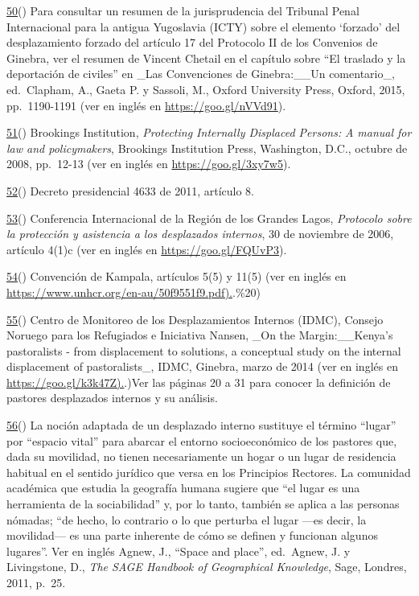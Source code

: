 \documentclass[
]{book}
\begin{document}
\protect\hyperlink{sdfootnote50anc}{50}() Para consultar un resumen de la jurisprudencia del Tribunal Penal Internacional para la antigua Yugoslavia (ICTY) sobre el elemento `forzado' del desplazamiento forzado del artículo 17 del Protocolo II de los Convenios de Ginebra, ver el resumen de Vincent Chetail en el capítulo sobre ``El traslado y la deportación de civiles'' en \_Las Convenciones de Ginebra:\_\_Un comentario\_, ed.~Clapham, A., Gaeta P. y Sassoli, M., Oxford University Press, Oxford, 2015, pp.~1190-1191 (ver en inglés en \url{https://goo.gl/nVVd91}).

\protect\hyperlink{sdfootnote51anc}{51}() Brookings Institution, \emph{Protecting Internally Displaced Persons:} \emph{A manual for law and policymakers}, Brookings Institution Press, Washington, D.C., octubre de 2008, pp.~12-13 (ver en inglés en \url{https://goo.gl/3xy7w5}).

\protect\hyperlink{sdfootnote52anc}{52}() Decreto presidencial 4633 de 2011, artículo 8.

\protect\hyperlink{sdfootnote53anc}{53}() Conferencia Internacional de la Región de los Grandes Lagos, \emph{Protocolo sobre la protección y asistencia a los desplazados internos}, 30 de noviembre de 2006, artículo 4(1)c (ver en inglés en \url{https://goo.gl/FQUvP3}).

\protect\hyperlink{sdfootnote54anc}{54}() Convención de Kampala, artículos 5(5) y 11(5) (ver en inglés en \href{https://goo.gl/BrdqYX}{https://www.unhcr.org/en-au/50f9551f9.pdf).}.\%20)

\protect\hyperlink{sdfootnote55anc}{55}() Centro de Monitoreo de los Desplazamientos Internos (IDMC), Consejo Noruego para los Refugiados e Iniciativa Nansen, \_On the Margin:\_\_Kenya's pastoralists - from displacement to solutions, a conceptual study on the internal displacement of pastoralists\_, IDMC, Ginebra, marzo de 2014 (ver en inglés en \href{https://goo.gl/k3k47Z}{https://goo.gl/k3k47Z).}.)Ver las páginas 20 a 31 para conocer la definición de pastores desplazados internos y su análisis.

\protect\hyperlink{sdfootnote56anc}{56}() La noción adaptada de un desplazado interno sustituye el término ``lugar'' por ``espacio vital'' para abarcar el entorno socioeconómico de los pastores que, dada su movilidad, no tienen necesariamente un hogar o un lugar de residencia habitual en el sentido jurídico que versa en los Principios Rectores. La comunidad académica que estudia la geografía humana sugiere que ``el lugar es una herramienta de la sociabilidad'' y, por lo tanto, también se aplica a las personas nómadas; ``de hecho, lo contrario o lo que perturba el lugar ---es decir, la movilidad--- es una parte inherente de cómo se definen y funcionan algunos lugares''. Ver en inglés Agnew, J., ``Space and place'', ed.~Agnew, J. y Livingstone, D., \emph{The SAGE Handbook of Geographical Knowledge}, Sage, Londres, 2011, p.~25.
\end{document}

